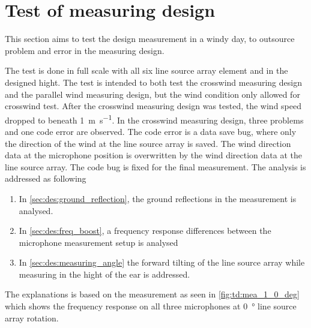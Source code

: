 \section{Test of measuring design}\label{sec:ds:test_of_mes_des}
This section aims to test the design measurement in a windy day, to outsource problem and error in the measuring design. 


The test is done in full scale with all six line source array element and in the designed hight. The test is intended to both test the crosswind measuring design and the parallel wind measuring design, but the wind condition only allowed for crosswind test. After the crosswind measuring design was tested, the wind speed dropped to beneath \SI{1}{\meter\per\second}.
In the crosswind measuring design, three problems and one code error are observed. The code error is a data save bug, where only the direction of the wind at the line source array is saved. The wind direction data at the microphone position is overwritten by the wind direction data at the line source array. The code bug is fixed for the final measurement. The analysis is addressed as following  

\begin{enumerate}
\item In \autoref{sec:des:ground_reflection}, the ground reflections in the measurement is analysed.
\item In \autoref{sec:des:freq_boost}, a frequency response differences between the microphone measurement setup is analysed
\item In \autoref{sec:des:measuring_angle}  the forward tilting of the line source array while measuring in the hight of the ear is addressed. 
\end{enumerate}


The explanations is based on the measurement as seen in \autoref{fig:td:mea_1_0_deg} which shows the frequency response on all three microphones at \SI{0}{\degree} line source array rotation.


